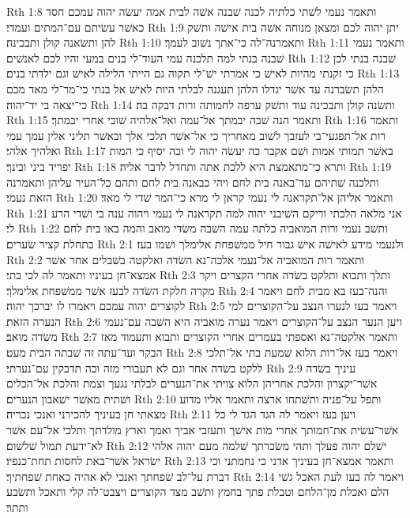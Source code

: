 Rth 1:8  ותאמר נעמי לשׁתי כלתיה לכנה שׁבנה אשׁה לבית אמה יעשׂה יהוה עמכם חסד כאשׁר עשׂיתם עם־המתים ועמדי׃
Rth 1:9  יתן יהוה לכם ומצאן מנוחה אשׁה בית אישׁה ותשׁק להן ותשׂאנה קולן ותבכינה׃
Rth 1:10  ותאמרנה־לה כי־אתך נשׁוב לעמך׃
Rth 1:11  ותאמר נעמי שׁבנה בנתי למה תלכנה עמי העוד־לי בנים במעי והיו לכם לאנשׁים׃
Rth 1:12  שׁבנה בנתי לכן כי זקנתי מהיות לאישׁ כי אמרתי ישׁ־לי תקוה גם הייתי הלילה לאישׁ וגם ילדתי בנים׃
Rth 1:13  הלהן תשׂברנה עד אשׁר יגדלו הלהן תעגנה לבלתי היות לאישׁ אל בנתי כי־מר־לי מאד מכם כי־יצאה בי יד־יהוה׃
Rth 1:14  ותשׂנה קולן ותבכינה עוד ותשׁק ערפה לחמותה ורות דבקה בה׃
Rth 1:15  ותאמר הנה שׁבה יבמתך אל־עמה ואל־אלהיה שׁובי אחרי יבמתך׃
Rth 1:16  ותאמר רות אל־תפגעי־בי לעזבך לשׁוב מאחריך כי אל־אשׁר תלכי אלך ובאשׁר תליני אלין עמך עמי ואלהיך אלהי׃
Rth 1:17  באשׁר תמותי אמות ושׁם אקבר כה יעשׂה יהוה לי וכה יסיף כי המות יפריד ביני ובינך׃
Rth 1:18  ותרא כי־מתאמצת היא ללכת אתה ותחדל לדבר אליה׃
Rth 1:19  ותלכנה שׁתיהם עד־באנה בית לחם ויהי כבאנה בית לחם ותהם כל־העיר עליהן ותאמרנה הזאת נעמי׃
Rth 1:20  ותאמר אליהן אל־תקראנה לי נעמי קראן לי מרא כי־המר שׁדי לי מאד׃
Rth 1:21  אני מלאה הלכתי וריקם השׁיבני יהוה למה תקראנה לי נעמי ויהוה ענה בי ושׁדי הרע לי׃
Rth 1:22  ותשׁב נעמי ורות המואביה כלתה עמה השׁבה משׂדי מואב והמה באו בית לחם בתחלת קציר שׂערים׃
Rth 2:1  ולנעמי מידע לאישׁה אישׁ גבור חיל ממשׁפחת אלימלך ושׁמו בעז׃
Rth 2:2  ותאמר רות המואביה אל־נעמי אלכה־נא השׂדה ואלקטה בשׁבלים אחר אשׁר אמצא־חן בעיניו ותאמר לה לכי בתי׃
Rth 2:3  ותלך ותבוא ותלקט בשׂדה אחרי הקצרים ויקר מקרה חלקת השׂדה לבעז אשׁר ממשׁפחת אלימלך׃
Rth 2:4  והנה־בעז בא מבית לחם ויאמר לקוצרים יהוה עמכם ויאמרו לו יברכך יהוה׃
Rth 2:5  ויאמר בעז לנערו הנצב על־הקוצרים למי הנערה הזאת׃
Rth 2:6  ויען הנער הנצב על־הקוצרים ויאמר נערה מואביה היא השׁבה עם־נעמי משׂדה מואב׃
Rth 2:7  ותאמר אלקטה־נא ואספתי בעמרים אחרי הקוצרים ותבוא ותעמוד מאז הבקר ועד־עתה זה שׁבתה הבית מעט׃
Rth 2:8  ויאמר בעז אל־רות הלוא שׁמעת בתי אל־תלכי ללקט בשׂדה אחר וגם לא תעבורי מזה וכה תדבקין עם־נערתי׃
Rth 2:9  עיניך בשׂדה אשׁר־יקצרון והלכת אחריהן הלוא צויתי את־הנערים לבלתי נגעך וצמת והלכת אל־הכלים ושׁתית מאשׁר ישׁאבון הנערים׃
Rth 2:10  ותפל על־פניה ותשׁתחו ארצה ותאמר אליו מדוע מצאתי חן בעיניך להכירני ואנכי נכריה׃
Rth 2:11  ויען בעז ויאמר לה הגד הגד לי כל אשׁר־עשׂית את־חמותך אחרי מות אישׁך ותעזבי אביך ואמך וארץ מולדתך ותלכי אל־עם אשׁר לא־ידעת תמול שׁלשׁום׃
Rth 2:12  ישׁלם יהוה פעלך ותהי משׂכרתך שׁלמה מעם יהוה אלהי ישׂראל אשׁר־באת לחסות תחת־כנפיו׃
Rth 2:13  ותאמר אמצא־חן בעיניך אדני כי נחמתני וכי דברת על־לב שׁפחתך ואנכי לא אהיה כאחת שׁפחתיך׃
Rth 2:14  ויאמר לה בעז לעת האכל גשׁי הלם ואכלת מן־הלחם וטבלת פתך בחמץ ותשׁב מצד הקוצרים ויצבט־לה קלי ותאכל ותשׂבע ותתר׃
